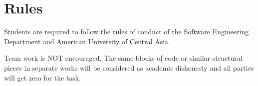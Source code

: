 \documentclass[12pt,a4paper,oneside]{article}
\begin{document}
    \section{Rules}

        Students are required to follow the rules of conduct of the Software
        Engineering Department and American University of Central Asia.

        Team work is NOT encouraged. The same blocks of code or similar
        structural pieces in separate works will be considered as academic
        dishonesty and all parties will get zero for the task.
\end{document}
